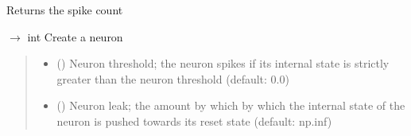 \documentclass[letterpaper,10pt,english]{sphinxmanual}
\begin{document}
\begin{fulllineitems}
\begin{fulllineitems}
\begin{quote}
\begin{description}
\begin{enumerate}
\end{enumerate}


\end{description}\end{quote}

\end{fulllineitems}


\begin{fulllineitems}
\label{\detokenize{index:superneuromat.SNN.count_spikes}}
\pysigstartsignatures
\pysiglinewithargsret
{}
{}
{}
\pysigstopsignatures
\sphinxAtStartPar
Returns the spike count

\end{fulllineitems}


\begin{fulllineitems}
\label{\detokenize{index:id1}}
\pysigstartsignatures
\pysiglinewithargsret
{}
{\sphinxparamcomma {}\sphinxparamcomma {}\sphinxparamcomma {}}
{{ $\rightarrow$ int}}
\pysigstopsignatures
\sphinxAtStartPar
Create a neuron
\begin{quote}\begin{description}
\begin{itemize}
\item {} 
\sphinxAtStartPar
{} () \textendash{} Neuron threshold; the neuron spikes if its internal state is strictly greater than the neuron threshold (default: 0.0)

\item {} 
\sphinxAtStartPar
{} () \textendash{} Neuron leak; the amount by which by which the internal state of the neuron is pushed towards its reset state (default: np.inf)


\end{itemize}
\end{description}
\end{quote}
\end{fulllineitems}
\end{fulllineitems}
\end{document}

